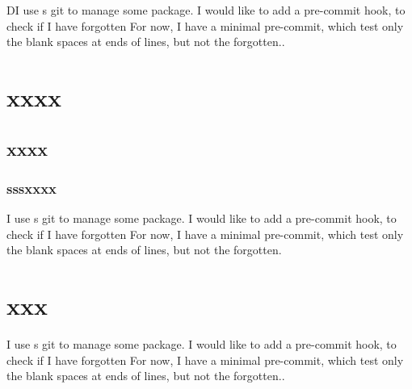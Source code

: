 \documentclass[a4paper, twoside, 12pt]{memoir}
\begin{document}
DI use s git to manage some package.
I would like to add a pre-commit hook, to check if I have forgotten
For now, I have a minimal pre-commit, which test only the blank spaces at ends of lines, but not the forgotten..

\section*{xxxx}
\subsection*{xxxx}
\subsubsection{sssxxxx}
I use s git to manage some package.
I would like to add a pre-commit hook, to check if I have forgotten
For now, I have a minimal pre-commit, which test only the blank spaces at ends of lines, but not the forgotten.

\section{xxx}

I use s git to manage some package.
I would like to add a pre-commit hook, to check if I have forgotten
For now, I have a minimal pre-commit, which test only the blank spaces at ends of lines, but not the forgotten..
\end{document}
